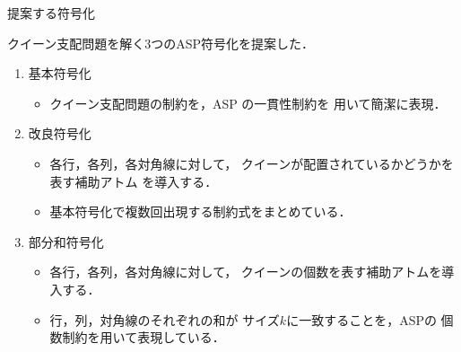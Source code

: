 \documentclass[dvipdfmx,10pt]{beamer}
\begin{document}
\begin{frame}{提案する符号化}
 \begin{block}{}\centering
   クイーン支配問題を解く3つのASP符号化を提案した．
 \end{block}
 \begin{enumerate}
   \item \alert{基本符号化}
   \begin{itemize}
     \item クイーン支配問題の制約を，ASP の一貫性制約を
      用いて簡潔に表現．
   \end{itemize}
   \item \alert{改良符号化}
   \begin{itemize}
      \item 各行，各列，各対角線に対して，
        クイーンが配置されているかどうかを表す補助アトム
        を導入する．
      \item 基本符号化で複数回出現する制約式をまとめている．
   \end{itemize}
   \item \alert{部分和符号化}
   \begin{itemize}
      \item 各行，各列，各対角線に対して，
        クイーンの個数を表す補助アトムを導入する．
      \item 行，列，対角線のそれぞれの和が
        サイズ$k$に一致することを，ASPの
        個数制約を用いて表現している．
   \end{itemize}
 \end{enumerate}
\end{frame}

%
%
 
\end{document}

